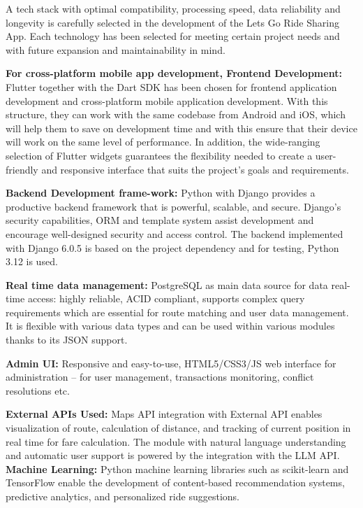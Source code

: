 
A tech stack with optimal compatibility, processing speed, data reliability and longevity is carefully selected in the development of the Lets Go Ride Sharing App. Each technology has been selected for meeting certain project needs and with future expansion and maintainability in mind.

\textbf{For cross-platform mobile app development, Frontend Development:} Flutter together with the Dart SDK has been chosen for frontend application development and cross-platform mobile application development. With this structure, they can work with the same codebase from Android and iOS, which will help them to save on development time and with this ensure that their device will work on the same level of performance. In addition, the wide-ranging selection of Flutter widgets guarantees the flexibility needed to create a user-friendly and responsive interface that suits the project's goals and requirements.

\textbf{Backend Development frame-work:} Python with Django provides a productive backend framework that is powerful, scalable, and secure. Django's security capabilities, ORM and template system assist development and encourage well-designed security and access control. The backend implemented with Django 6.0.5 is based on the project dependency and for testing, Python 3.12 is used.

\textbf{Real time data management:} PostgreSQL as main data source for data real-time access: highly reliable, ACID compliant, supports complex query requirements which are essential for route matching and user data management. It is flexible with various data types and can be used within various modules thanks to its JSON support.

\textbf{Admin UI: } Responsive and easy-to-use, HTML5/CSS3/JS web interface for administration – for user management, transactions monitoring, conflict resolutions etc.

\textbf{External APIs Used:} Maps API integration with External API enables visualization of route, calculation of distance, and tracking of current position in real time for fare calculation. The module with natural language understanding and automatic user support is powered by the integration with the LLM API.
\textbf{Machine Learning:} Python machine learning libraries such as scikit-learn and TensorFlow enable the development of content-based recommendation systems, predictive analytics, and personalized ride suggestions.

